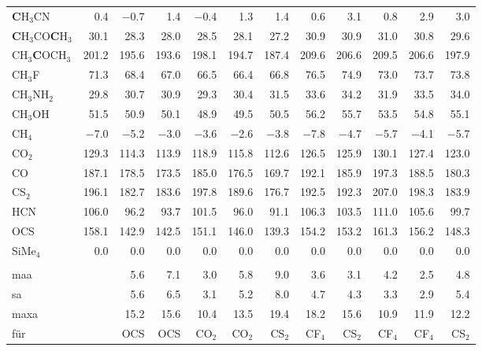 \begin{table}[ht!]
{\begin{tabular}{lr|rrrrr|rrrrr}
    \textbf{C}H$_{3}$CN & 0.4   & $-$0.7  & 1.4   & $-$0.4  & 1.3   & 1.4   & 0.6   & 3.1   & 0.8   & 2.9   & 3.0 \\
    \textbf{C}H$_{3}$CO\textbf{C}H$_{3}$ & 30.1  & 28.3  & 28.0  & 28.5  & 28.1  & 27.2  & 30.9  & 30.9  & 31.0  & 30.8  & 29.6 \\
    CH$_{3}$\textbf{C}OCH$_{3}$ & 201.2 & 195.6 & 193.6 & 198.1 & 194.7 & 187.4 & 209.6 & 206.6 & 209.5 & 206.6 & 197.9 \\
    CH$_{3}$F  & 71.3  & 68.4  & 67.0  & 66.5  & 66.4  & 66.8  & 76.5  & 74.9  & 73.0  & 73.7  & 73.8 \\
    CH$_{3}$NH$_{2}$ & 29.8  & 30.7  & 30.9  & 29.3  & 30.4  & 31.5  & 33.6  & 34.2  & 31.9  & 33.5  & 34.0 \\
    CH$_{3}$OH & 51.5  & 50.9  & 50.1  & 48.9  & 49.5  & 50.5  & 56.2  & 55.7  & 53.5  & 54.8  & 55.1 \\
    CH$_{4}$   & $-$7.0  & $-$5.2  & $-$3.0  & $-$3.6  & $-$2.6  & $-$3.8  & $-$7.8  & $-$4.7  & $-$5.7  & $-$4.1  & $-$5.7 \\
    CO$_{2}$   & 129.3 & 114.3 & 113.9 & 118.9 & 115.8 & 112.6 & 126.5 & 125.9 & 130.1 & 127.4 & 123.0 \\
    CO    & 187.1 & 178.5 & 173.5 & 185.0 & 176.5 & 169.7 & 192.1 & 185.9 & 197.3 & 188.5 & 180.3 \\
    CS$_{2}$   & 196.1 & 182.7 & 183.6 & 197.8 & 189.6 & 176.7 & 192.5 & 192.3 & 207.0 & 198.3 & 183.9 \\
    HCN   & 106.0 & 96.2  & 93.7  & 101.5 & 96.0  & 91.1  & 106.3 & 103.5 & 111.0 & 105.6 & 99.7 \\
    OCS   & 158.1 & 142.9 & 142.5 & 151.1 & 146.0 & 139.3 & 154.2 & 153.2 & 161.3 & 156.2 & 148.3 \\
    SiMe$_{4}$ & 0.0   & 0.0   & 0.0   & 0.0   & 0.0   & 0.0   & 0.0   & 0.0   & 0.0   & 0.0   & 0.0 \\
          &       &       &       &       &       &       &       &       &       &       &  \\
    \ac{maa}   &       & 5.6   & 7.1   & 3.0   & 5.8   & 9.0   & 3.6   & 3.1   & 4.2   & 2.5   & 4.8 \\
    \ac{sa}   &       & 5.6   & 6.5   & 3.1   & 5.2   & 8.0   & 4.7   & 4.3   & 3.3   & 2.9   & 5.4 \\
    \ac{maxa}  &       & 15.2  & 15.6  & 10.4  & 13.5  & 19.4  & 18.2  & 15.6  & 10.9  & 11.9  & 12.2 \\
    für   &       & OCS   & OCS   & CO$_{2}$   & CO$_{2}$   & CS$_{2}$   & CF$_{4}$   & CS$_{2}$   & CF$_{4}$   & CF$_{4}$   & CS$_{2}$ \\
    \end{tabular}%
  \label{tab:cshifts}}%
\end{table}%

